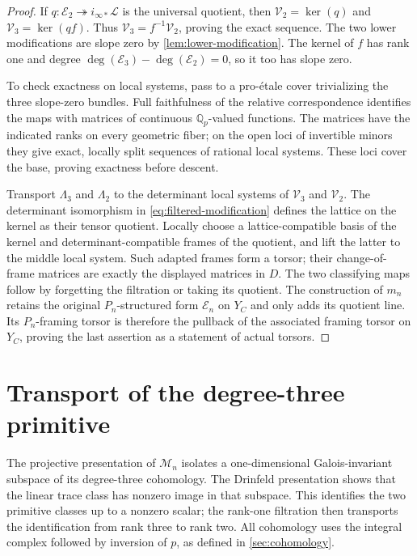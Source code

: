 \documentclass[11pt]{article}
\numberwithin{equation}{section}
\theoremstyle{definition}
\theoremstyle{remark}
\begin{document}
\begin{proof}
If $q:\mathcal E_2\twoheadrightarrow i_{\infty *}\mathcal L$
is the universal quotient, then
$\mathcal V_2=\ker(q)$ and $\mathcal V_3=\ker(qf)$.
Thus $\mathcal V_3=f^{-1}\mathcal V_2$, proving the exact sequence.
The two lower modifications are slope zero by
\cref{lem:lower-modification}.  The kernel of $f$ has rank one and
degree $\deg(\mathcal E_3)-\deg(\mathcal E_2)=0$, so it too has slope
zero.

To check exactness on local systems, pass to a pro-\'etale cover
trivializing the three slope-zero bundles.  Full faithfulness of the
relative correspondence identifies the maps with matrices of
continuous $\mathbb Q_p$-valued functions.  The matrices have the indicated
ranks on every geometric fiber; on the open loci of invertible minors
they give exact, locally split sequences of rational local systems.
These loci cover the base, proving exactness before descent.

Transport $\Lambda_3$ and $\Lambda_2$ to the determinant local systems
of $\mathcal V_3$ and $\mathcal V_2$.  The determinant isomorphism in
\cref{eq:filtered-modification} defines the lattice on the kernel as
their tensor quotient.  Locally choose a lattice-compatible basis of
the kernel and determinant-compatible frames of the quotient, and
lift the latter to the middle local system.  Such adapted frames form
a torsor; their change-of-frame matrices are exactly the displayed
matrices in $D$.  The two classifying maps follow by forgetting the
filtration or taking its quotient.  The construction of $m_n$ retains
the original $P_n$-structured form $\mathcal E_n$ on $Y_C$ and only
adds its quotient line.  Its $P_n$-framing torsor is therefore the
pullback of the associated framing torsor on $Y_C$, proving the last
assertion as a statement of actual torsors.
\end{proof}

\section{Transport of the degree-three primitive}\label{sec:degree-three}

The projective presentation of $\mathcal M_n$ isolates a
one-dimensional Galois-invariant subspace of its degree-three
cohomology. The Drinfeld presentation shows that the linear trace
class has nonzero image in that subspace. This identifies the two
primitive classes up to a nonzero scalar; the rank-one filtration
then transports the identification from rank three to rank two.
All cohomology uses the integral complex followed by inversion of
$p$, as defined in \cref{sec:cohomology}.
\end{document}
